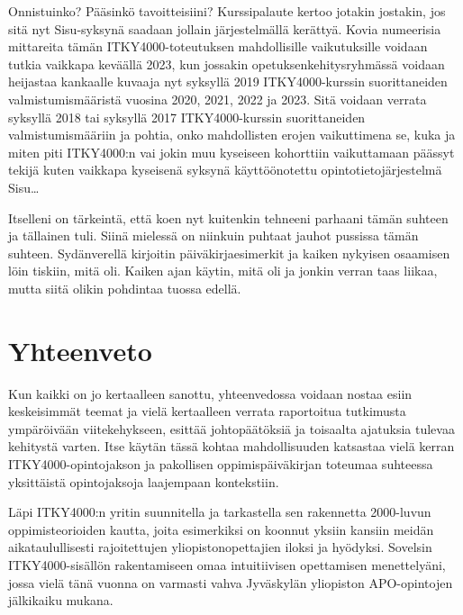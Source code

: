 \documentclass[utf8]{gradu3}
\begin{document}
Onnistuinko? Pääsinkö tavoitteisiini? Kurssipalaute kertoo jotakin jostakin, jos
sitä nyt Sisu-syksynä saadaan jollain järjestelmällä kerättyä.
%
Kovia numeerisia mittareita tämän ITKY4000-toteutuksen mahdollisille
vaikutuksille voidaan tutkia vaikkapa keväällä 2023, kun jossakin
opetuksenkehitysryhmässä voidaan heijastaa kankaalle kuvaaja nyt syksyllä 2019
ITKY4000-kurssin suorittaneiden valmistumismääristä vuosina 2020, 2021, 2022 ja
2023. Sitä voidaan verrata syksyllä 2018 tai syksyllä 2017 ITKY4000-kurssin
suorittaneiden valmistumismääriin ja pohtia, onko mahdollisten erojen
vaikuttimena se, kuka ja miten piti ITKY4000:n vai jokin muu kyseiseen
kohorttiin vaikuttamaan päässyt tekijä kuten vaikkapa kyseisenä syksynä
käyttöönotettu opintotietojärjestelmä Sisu\ldots

Itselleni on tärkeintä, että koen nyt kuitenkin tehneeni parhaani tämän suhteen
ja tällainen tuli. Siinä mielessä on niinkuin puhtaat jauhot pussissa tämän
suhteen. Sydänverellä kirjoitin päiväkirjaesimerkit ja kaiken nykyisen osaamisen
löin tiskiin, mitä oli. Kaiken ajan käytin, mitä oli ja jonkin verran taas
liikaa, mutta siitä olikin pohdintaa tuossa edellä.




\chapter{Yhteenveto}
\label{yhteenveto}

Kun kaikki on jo kertaalleen sanottu, yhteenvedossa voidaan nostaa esiin
keskeisimmät teemat ja vielä kertaalleen verrata raportoitua tutkimusta
ympäröivään viitekehykseen, esittää johtopäätöksiä ja toisaalta ajatuksia
tulevaa kehitystä varten. Itse käytän tässä kohtaa mahdollisuuden katsastaa
vielä kerran ITKY4000-opintojakson ja pakollisen oppimispäiväkirjan toteumaa
suhteessa yksittäistä opintojaksoja laajempaan kontekstiin.

Läpi ITKY4000:n yritin suunnitella ja tarkastella sen rakennetta 2000-luvun
oppimisteorioiden kautta, joita esimerkiksi
\textcite{Illeris2009contemporaryTheories} on koonnut yksiin kansiin meidän
aikataulullisesti rajoitettujen yliopistonopettajien iloksi ja hyödyksi.
Sovelsin ITKY4000-sisällön rakentamiseen omaa intuitiivisen opettamisen
menettelyäni, jossa vielä tänä vuonna on varmasti vahva Jyväskylän yliopiston
APO-opintojen \parencite{LaineMalinen2009elavaPeilisali} jälkikaiku mukana.
 
\end{document}
